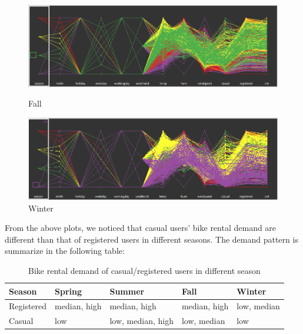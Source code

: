 \documentclass[12pt]{article}
\begin{document}
	 \begin{figure}[H]
	 	\centering
	 	\begin{minipage}{.5\textwidth}
	 		\centering
	 		\includegraphics[width=\linewidth]{figures/fall_pcor.png}
	 		\caption{Fall}
	 	\end{minipage}%
	 	\begin{minipage}{.5\textwidth}
	 		\centering
	 		\includegraphics[width=\linewidth]{figures/winter_pcor.png}
	 		\caption{Winter}
	 	\end{minipage}
	 \end{figure}
	From the above plots, we noticed that casual users' bike rental demand are different than that of registered users in different seasons. The demand pattern is summarize in the following table:
	
	\begin{table}[H]
		\centering
		\begin{tabular}{|l|l|l|l|l|}
			\hline
			Season & 	Spring & Summer & Fall & Winter\\ \hline
			Registered & median, high & median, high & median, high & low, median\\
			Casual & low & low, median, high & low, median & low \\ \hline
		\end{tabular}
		\caption{Bike rental demand of casual/registered users in different season}
	\end{table}
		
\end{document}
